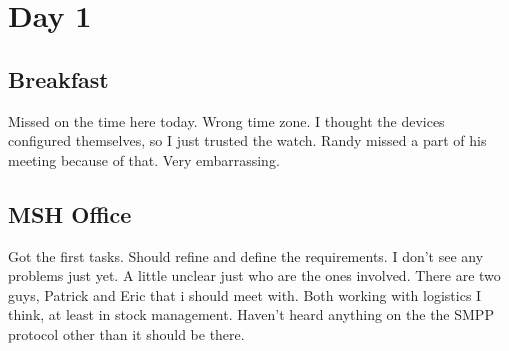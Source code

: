 \section{Day 1}
\subsection{Breakfast}
Missed on the time here today. Wrong time zone.
I thought the devices configured themselves, so I just trusted the watch.
Randy missed a part of his meeting because of that. 
Very embarrassing.
\subsection{MSH Office}
Got the first tasks. Should refine and define the requirements.
I don't see any problems just yet. A little unclear just who are the ones involved.
There are two guys, Patrick and Eric that i should meet with.
Both working with logistics I think, at least in stock management.
Haven't heard anything on the the SMPP protocol other than it should be there.
